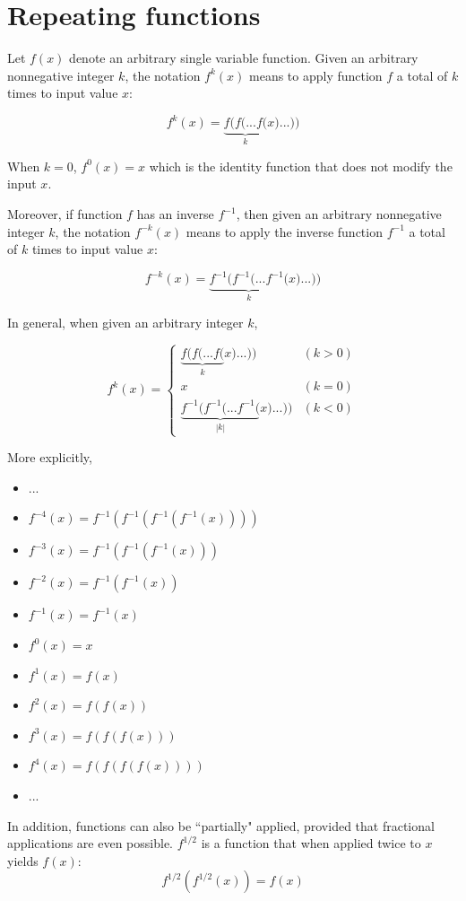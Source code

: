\documentclass{article}
\begin{document}
\section*{Repeating functions}


Let \(f(x)\) denote an arbitrary single variable function. Given an arbitrary nonnegative integer \(k\), the notation \(f^k(x)\) means to apply function \(f\) a total of \(k\) times to input value \(x\):

\[f^k(x) = \underbrace{f(f(...f(}_k x)...))\]

When \(k = 0\), \(f^0(x) = x\) which is the identity function that does not modify the input \(x\).


Moreover, if function \(f\) has an inverse \(f^{-1}\), then given an arbitrary nonnegative integer \(k\), the notation \(f^{-k}(x)\) means to apply the inverse function \(f^{-1}\) a total of \(k\) times to input value \(x\):

\[f^{-k}(x) = \underbrace{f^{-1}(f^{-1}(...f^{-1}(}_k x)...))\]

In general, when given an arbitrary integer \(k\), 

\[f^k(x) = \left\{\begin{array}{cc} \underbrace{f(f(...f(}_k x)...)) & (k > 0) \\ x & (k = 0) \\ \underbrace{f^{-1}(f^{-1}(...f^{-1}(}_{|k|} x)...)) & (k < 0) \end{array}\right.\]

More explicitly,

\begin{itemize}
\item ... 
\item \(f^{-4}(x) = f^{-1}(f^{-1}(f^{-1}(f^{-1}(x))))\)
\item \(f^{-3}(x) = f^{-1}(f^{-1}(f^{-1}(x)))\)
\item \(f^{-2}(x) = f^{-1}(f^{-1}(x))\)
\item \(f^{-1}(x) = f^{-1}(x)\)
\item \(f^0(x) = x\)
\item \(f^1(x) = f(x)\)
\item \(f^2(x) = f(f(x))\)
\item \(f^3(x) = f(f(f(x)))\)
\item \(f^4(x) = f(f(f(f(x))))\)
\item ... 
\end{itemize}

In addition, functions can also be ``partially" applied, provided that fractional applications are even possible. \(f^{1/2}\) is a function that when applied twice to \(x\) yields \(f(x)\):
\[f^{1/2}(f^{1/2}(x)) = f(x)\]
\end{document}

